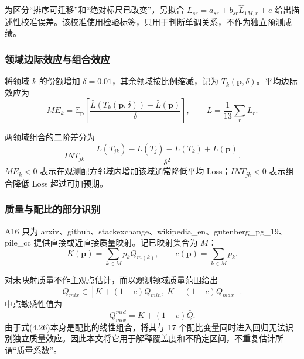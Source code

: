 \documentclass[bwprint]{gmcmthesis}
\providecommand{\E}{\mathbb{E}}
\begin{document}
        为区分``排序可迁移''和``绝对标尺已改变''，另拟合
        $L_{sr}=a_{sr}+b_{sr}\widehat L_{1M,r}+e$ 给出描述性校准误差。该校准使用检验标签，只用于判断单调关系，不作为独立预测成绩。

        
        \subsubsection{领域边际效应与组合效应} %
        将领域 $k$ 的份额增加 $\delta=0.01$，其余领域按比例缩减，记为 $T_k(\bm p,\delta)$。平均边际效应为
        \begin{equation}
        ME_k=\E_{\bm p}\left[
        \frac{\bar L(T_k(\bm p,\delta))-\bar L(\bm p)}{\delta}
        \right],\qquad
        \bar L=\frac1{13}\sum_rL_r.
        \label{eq:marginal}
        \end{equation}
        
        两领域组合的二阶差分为
        \begin{equation}
        INT_{jk}=\frac{
        \bar L(T_{jk})-\bar L(T_j)-\bar L(T_k)+\bar L(\bm p)
        }{\delta^2}.
        \label{eq:interaction}
        \end{equation}
        $ME_k<0$ 表示在观测配方邻域内增加该域通常降低平均 Loss；$INT_{jk}<0$ 表示组合降低 Loss 超过可加预期。

        
        \subsubsection{质量与配比的部分识别}  %
        A16 只为 arxiv、github、stackexchange、wikipedia\_en、gutenberg\_pg\_19、pile\_cc 提供直接或近直接质量映射。记已映射集合为 $M$：
        \begin{equation}
        K(\bm p)=\sum_{k\in M}p_kQ_{m(k)},\qquad
        c(\bm p)=\sum_{k\in M}p_k.
        \label{eq:mapped}
        \end{equation}
        
        对未映射质量不作主观点估计，而以观测领域质量范围给出
        \begin{equation}
        Q_{mix}\in\left[K+(1-c)Q_{min},\ K+(1-c)Q_{max}\right].
        \label{eq:partial}
        \end{equation}
        中点敏感性值为
        \begin{equation}
        Q_{mix}^{mid}=K+(1-c)\bar Q.
        \label{eq:qmid}
        \end{equation}
        由于式(4.26)本身是配比的线性组合，将其与 17 个配比变量同时进入回归无法识别独立质量效应。因此本文将它用于解释覆盖度和不确定区间，不重复估计所谓``质量系数''。
\end{document}
